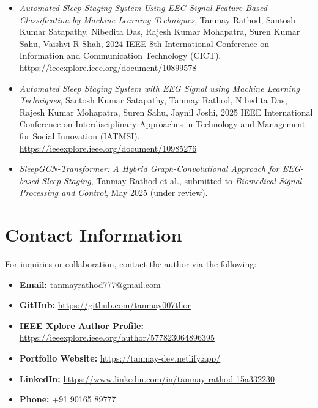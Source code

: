 \begin{itemize}
		\item \textit{Automated Sleep Staging System Using EEG Signal Feature-Based Classification by Machine Learning Techniques}, Tanmay Rathod, Santosh Kumar Satapathy, Nibedita Das, Rajesh Kumar Mohapatra, Suren Kumar Sahu, Vaishvi R Shah, 2024 IEEE 8th International Conference on Information and Communication Technology (CICT). \url{https://ieeexplore.ieee.org/document/10899578}

	\item \textit{Automated Sleep Staging System with EEG Signal using Machine Learning Techniques}, Santosh Kumar Satapathy, Tanmay Rathod, Nibedita Das, Rajesh Kumar Mohapatra, Suren Sahu, Jaynil Joshi, 2025 IEEE International Conference on Interdisciplinary Approaches in Technology and Management for Social Innovation (IATMSI). \url{https://ieeexplore.ieee.org/document/10985276}
	
	  \item \textit{SleepGCN-Transformer: A Hybrid Graph-Convolutional Approach for EEG-based Sleep Staging}, Tanmay Rathod et al., submitted to \textit{Biomedical Signal Processing and Control}, May 2025 (under review).
	

	\end{itemize}
	
	
	
\section{Contact Information}

For inquiries or collaboration, contact the author via the following:



\begin{itemize}
	\item \textbf{Email:} \href{mailto:tanmayrathod777@gmail.com}{tanmayrathod777@gmail.com}
	\item \textbf{GitHub:} \url{https://github.com/tanmay007thor}
	\item \textbf{IEEE Xplore Author Profile:} \url{https://ieeexplore.ieee.org/author/577823064896395}
	\item \textbf{Portfolio Website:} \url{https://tanmay-dev.netlify.app/}
	\item \textbf{LinkedIn:} \url{https://www.linkedin.com/in/tanmay-rathod-15a332230}
	\item \textbf{Phone:} +91 90165 89777
\end{itemize}

